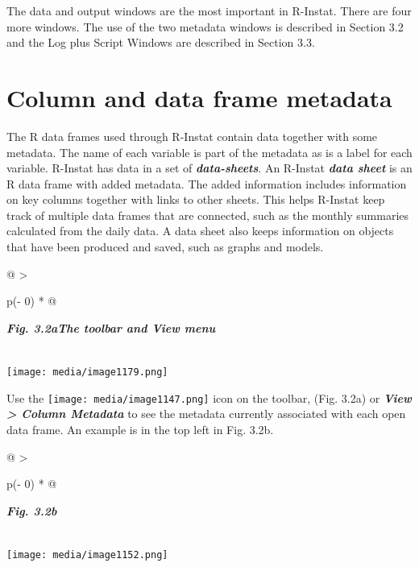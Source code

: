 \documentclass[
  letterpaper,
  DIV=11,
  numbers=noendperiod]{scrreprt}
\begin{document}
The data and output windows are the most important in R-Instat. There
are four more windows. The use of the two metadata windows is described
in Section 3.2 and the Log plus Script Windows are described in Section
3.3.

\section{Column and data frame
metadata}\label{column-and-data-frame-metadata}

The R data frames used through R-Instat contain data together with some
metadata. The name of each variable is part of the metadata as is a
label for each variable. R-Instat has data in a set of
\textbf{\emph{data-sheets}}. An R-Instat \textbf{\emph{data sheet}} is
an R data frame with added metadata. The added information includes
information on key columns together with links to other sheets. This
helps R-Instat keep track of multiple data frames that are connected,
such as the monthly summaries calculated from the daily data. A data
sheet also keeps information on objects that have been produced and
saved, such as graphs and models.

\begin{longtable}[]{@{}
  >{\raggedright\arraybackslash}p{(\columnwidth - 0\tabcolsep) * }@{}}
\toprule\noalign{}
\begin{minipage}[b]{\linewidth}\raggedright
\textbf{\emph{Fig. 3.2aThe toolbar and View menu}}
\end{minipage} \\
\midrule\noalign{}
\endhead
\bottomrule\noalign{}
\endlastfoot
\texttt{[image: media/image1179.png]} \\
\end{longtable}

Use the
\texttt{[image: media/image1147.png]}
icon on the toolbar, (Fig. 3.2a) or \textbf{\emph{View \textgreater{}
Column Metadata}} to see the metadata currently associated with each
open data frame. An example is in the top left in Fig. 3.2b.

\begin{longtable}[]{@{}
  >{\raggedright\arraybackslash}p{(\columnwidth - 0\tabcolsep) * }@{}}
\toprule\noalign{}
\begin{minipage}[b]{\linewidth}\raggedright
\textbf{\emph{Fig. 3.2b}}
\end{minipage} \\
\midrule\noalign{}
\endhead
\bottomrule\noalign{}
\endlastfoot
\texttt{[image: media/image1152.png]} \\
\end{longtable}
\end{document}
